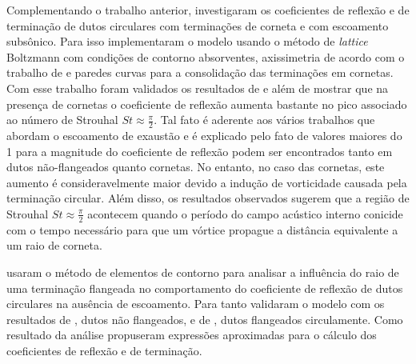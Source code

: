 Complementando o trabalho anterior,  investigaram os coeficientes de reflexão e de terminação de dutos circulares com terminações de corneta e com escoamento subsônico. Para isso implementaram o modelo usando o método de \textit{lattice} Boltzmann com condições de contorno absorventes, axissimetria de acordo com o trabalho de  e paredes curvas para a consolidação das terminações em cornetas. Com esse trabalho foram validados os resultados de  e  além de mostrar que na presença de cornetas o coeficiente de reflexão aumenta bastante no pico associado ao número de Strouhal $St \approx \frac{\pi}{2}$. Tal fato é aderente aos vários trabalhos que abordam o escoamento de exaustão e é explicado pelo fato de valores maiores do 1 para a magnitude do coeficiente de reflexão podem ser encontrados tanto em dutos não-flangeados quanto cornetas. No entanto, no caso das cornetas, este aumento é consideravelmente maior devido a indução de vorticidade causada pela terminação circular. Além disso, os resultados observados sugerem que a região de Strouhal $St \approx \frac{\pi}{2}$ acontecem quando o período do campo acústico interno conicide com o tempo necessário para que um vórtice propague a distância equivalente a um raio de corneta.

 usaram o método de elementos de contorno para analisar a influência do raio de uma terminação flangeada no comportamento do coeficiente de reflexão de dutos circulares na ausência de escoamento. Para tanto validaram o modelo com os resultados de , dutos não flangeados, e de , dutos flangeados circulamente. Como resultado da análise propuseram expressões aproximadas para o cálculo dos coeficientes de reflexão e de terminação.

